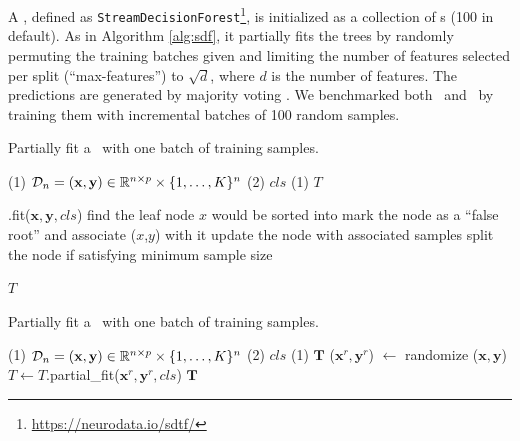 A \SDF, defined as \texttt{StreamDecisionForest}\footnote{\url{https://neurodata.io/sdtf/}}, is initialized as a collection of \SDT s (100 in default). As in Algorithm \ref{alg:sdf}, it partially fits the trees by randomly permuting the training batches given and limiting the number of features selected per split (``max-features'') to $\sqrt{d}$, where $d$ is the number of features. The predictions are generated by majority voting \citep{liaw2002classification, biau2008consistency, breiman2001random}. We benchmarked both \SDT~and \SDF~by training them with incremental batches of 100 random samples.

\begin{algorithm}[htb]
  \caption{Partially fit a \SDT~with one batch of training samples.}
\label{alg:partial}
\begin{algorithmic}[1]
  \Require 
  \Statex (1) $\mathcal{D}_n = (\mathbf{x},\mathbf{y}) \in \mathbb{R}^{n \times p} \times \{1,\ldots, K\}^n$ 
  \Statex (2) $cls$ 
  \Ensure 
  \Statex (1) $T$ 

  \State \Return \SDT.fit($\mathbf{x},\mathbf{y},cls$) 
\EndIf
{}
  \State find the leaf node $x$ would be sorted into 
  \State mark the node as a ``false root'' and associate ($x$,$y$) with it
\EndFor
{}
  \State update the node with associated samples
  \State split the node if satisfying minimum sample size
\EndFor

\State \Return $T$
\EndFunction 
\end{algorithmic}
\end{algorithm}

\begin{algorithm}[htb]
\caption{Partially fit a \SDF~with one batch of training samples.}
\label{alg:sdf}
\begin{algorithmic}[1]
  \Require
  \Statex (1) $\mathcal{D}_n = (\mathbf{x},\mathbf{y}) \in \mathbb{R}^{n \times p} \times \{1,\ldots, K\}^n$ 
  \Statex (2) $cls$ 
  \Ensure
  \Statex (1) $\mathbf{T}$ 
  \State ($\mathbf{x}^r,\mathbf{y}^r$) $\leftarrow$ randomize ($\mathbf{x},\mathbf{y}$)
  \State $T \leftarrow T$.partial\_fit($\mathbf{x}^r,\mathbf{y}^r,cls$) 
\EndFor
\State \Return $\mathbf{T}$
\EndFunction
\end{algorithmic}
\end{algorithm}

